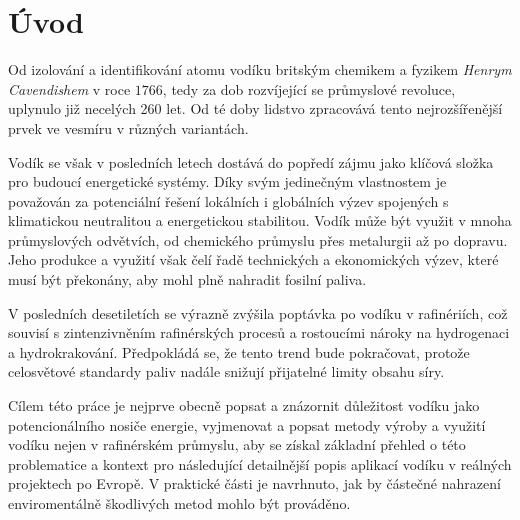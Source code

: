 \chapter*{Úvod}

Od izolování a identifikování atomu vodíku britským chemikem a fyzikem \textit{Henrym Cavendishem} v roce $1766$, tedy za dob rozvíjející se průmyslové revoluce, uplynulo již necelých 260 let. Od té doby lidstvo zpracovává tento nejrozšířenější prvek ve vesmíru v různých variantách.

Vodík se však v posledních letech dostává do popředí zájmu jako klíčová složka pro budoucí energetické systémy. Díky svým jedinečným vlastnostem je považován za potenciální řešení lokálních i globálních výzev spojených s klimatickou neutralitou a energetickou stabilitou. Vodík může být využit v mnoha průmyslových odvětvích, od chemického průmyslu přes metalurgii až po dopravu. Jeho produkce a využití však čelí řadě technických a ekonomických výzev, které musí být překonány, aby mohl plně nahradit fosilní paliva.

V posledních desetiletích se výrazně zvýšila poptávka po vodíku v rafinériích, což souvisí s zintenzivněním rafinérských procesů a rostoucími nároky na hydrogenaci a hydrokrakování. Předpokládá se, že tento trend bude pokračovat, protože celosvětové standardy paliv nadále snižují přijatelné limity obsahu síry.

Cílem této práce je nejprve obecně popsat a znázornit důležitost vodíku jako potencionálního nosiče energie, vyjmenovat a popsat metody výroby a využití vodíku nejen v rafinérském průmyslu, aby se získal základní přehled o této problematice a kontext pro následující detailnější popis aplikací vodíku v reálných projektech po Evropě. V praktické části je navrhnuto, jak by částečné nahrazení enviromentálně škodlivých metod mohlo být prováděno.